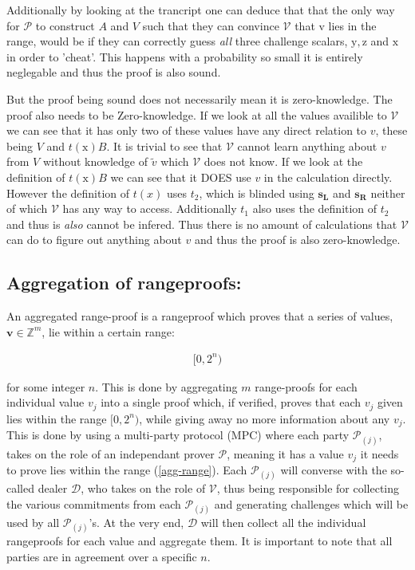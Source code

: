 \documentclass{article}
\newcommand{\eqn}[2]{\begin{equation}\label{#1}\begin{split}#2\end{split}\end{equation}}
\renewcommand{\vec}[1]{\boldsymbol{#1}}
\newcommand{\ran}[1]{\mathrm{#1}}
\newcommand{\vecran}[1]{\mathbf{#1}}
\newcommand{\V}{\mathcal{V}}
\renewcommand{\P}{\mathcal{P}}
\newcommand{\D}{\mathcal{D}}
\newcommand{\Z}{\mathbb{Z}}
\newcommand{\tv}{\widetilde{v}}
\begin{document}
Additionally by looking at the trancript one can deduce that that the
only way for $\P$ to construct $A$ and $V$ such that they can convince
$\V$ that v lies in the range, would be if they can correctly guess
\textit{all} three challenge scalars, $\ran{y}, \ran{z}$ and $\ran{x}$
in order to 'cheat'. This happens with a probability so small it is
entirely neglegable and thus the proof is also sound.

But the proof being sound does not necessarily mean it is
zero-knowledge. The proof also needs to be Zero-knowledge. If we look
at all the values availible to $\V$ we can see that it has only two
of these values have any direct relation to $v$, these being $V$ and
$t(\ran{x})B$. It is trivial to see that $\V$ cannot learn anything
about $v$ from $V$ without knowledge of $\tv$ which $\V$ does not
know. If we look at the definition of $t(\ran{x})B$ we can see that
it DOES use $v$ in the calculation directly. However the definition
of $t(x)$ uses $t_2$, which is blinded using $\vecran{s_L}$ and
$\vecran{s_R}$ neither of which $\V$ has any way to access. Additionally
$t_1$ also uses the definition of $t_2$ and thus is \textit{also} cannot
be infered. Thus there is no amount of calculations that $\V$ can do to
figure out anything about $v$ and thus the proof is also zero-knowledge.

\subsection{Aggregation of rangeproofs:}

An aggregated range-proof is a rangeproof which proves that a series
of values, $\vec{v} \in \Z^m$, lie within a certain range:

\eqn{agg-range}{
	[0,2^n)
}

for some integer $n$. This is done by aggregating $m$ range-proofs for
each individual value $v_j$ into a single proof which, if verified,
proves that each $v_j$ given lies within the range $[0,2^n)$, while
giving away no more information about any $v_j$. This is done by using
a multi-party protocol (MPC) where each party $\P_{(j)}$, takes on the
role of an independant prover $\P$, meaning it has a value $v_j$ it
needs to prove lies within the range (\ref{agg-range}). Each $\P_{(j)}$
will converse with the so-called dealer $\D$, who takes on the role
of $\V$, thus being responsible for collecting the various commitments
from each $\P_{(j)}$ and generating challenges which will be used by all
$\P_{(j)}$'s. At the very end, $\D$ will then collect all the individual
rangeproofs for each value and aggregate them. It is important to note
that all parties are in agreement over a specific $n$.
\end{document}
